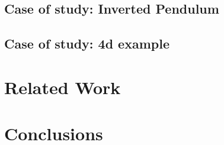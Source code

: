 \documentclass[sigconf]{acmart}
\begin{document}
\subsection{Case of study: Inverted Pendulum}
%		

\subsection{Case of study: 4d example}
\section{Related Work}
\section{Conclusions}

\end{document}
